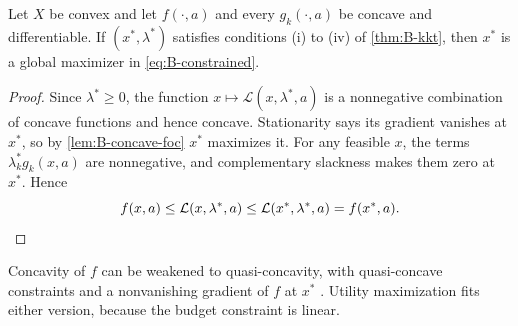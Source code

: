\begin{proposition}\label{prop:B-kkt-sufficient}
Let $X$ be convex and let $f(\cdot, a)$ and every $g_k(\cdot, a)$ be concave and differentiable. If $(x^*, \lambda^*)$
satisfies conditions (i) to (iv) of \cref{thm:B-kkt}, then $x^*$ is a global maximizer in \eqref{eq:B-constrained}.
\end{proposition}

\begin{proof}
Since $\lambda^* \geq 0$, the function $x \mapsto \mathcal{L}(x, \lambda^*, a)$ is a nonnegative combination of concave
functions and hence concave. Stationarity says its gradient vanishes at $x^*$, so by \cref{lem:B-concave-foc} $x^*$
maximizes it. For any feasible $x$, the terms $\lambda_k^*g_k(x, a)$ are nonnegative, and complementary slackness makes
them zero at $x^*$. Hence
\begin{equation*}
f(x, a) \leq \mathcal{L}(x, \lambda^*, a) \leq \mathcal{L}(x^*, \lambda^*, a) = f(x^*, a) .
\qedhere
\end{equation*}
\end{proof}

Concavity of $f$ can be weakened to quasi-concavity, with quasi-concave constraints and a nonvanishing gradient of
$f$ at $x^*$ \citep{ArrowEnthoven1961}. Utility maximization fits either version, because the budget constraint is
linear.

